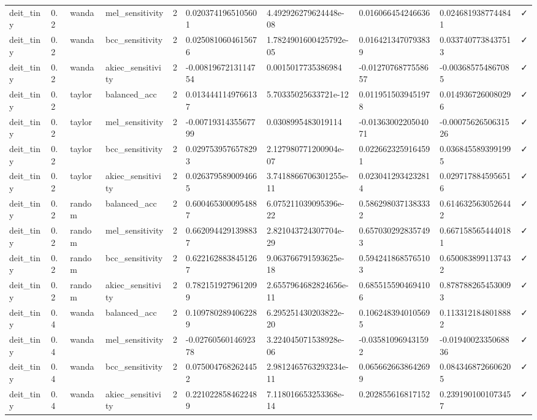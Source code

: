 \begin{table}[t]
\begin{tabular}{llllllllll}
deit\_tiny & 0.2 & wanda & mel\_sensitivity & 2 & 0.0203741965105601 & 4.492926279624448e-08 & 0.016066454246636 & 0.0246819387744841 & ✓ \\
deit\_tiny & 0.2 & wanda & bcc\_sensitivity & 2 & 0.0250810604615676 & 1.7824901600425792e-05 & 0.0164213470793839 & 0.0337407738437513 & ✓ \\
deit\_tiny & 0.2 & wanda & akiec\_sensitivity & 2 & -0.0081967213114754 & 0.0015017735386984 & -0.0127076877558657 & -0.003685754867085 & ✓ \\
deit\_tiny & 0.2 & taylor & balanced\_acc & 2 & 0.0134441149766137 & 5.70335025633721e-12 & 0.0119515039451978 & 0.0149367260080296 & ✓ \\
deit\_tiny & 0.2 & taylor & mel\_sensitivity & 2 & -0.0071931435567799 & 0.0308995483019114 & -0.0136300220504071 & -0.0007562650631526 & ✓ \\
deit\_tiny & 0.2 & taylor & bcc\_sensitivity & 2 & 0.0297539576578293 & 2.127980771200904e-07 & 0.0226623259164591 & 0.0368455893991995 & ✓ \\
deit\_tiny & 0.2 & taylor & akiec\_sensitivity & 2 & 0.0263795890094665 & 3.7418866706301255e-11 & 0.0230412934232814 & 0.0297178845956516 & ✓ \\
deit\_tiny & 0.2 & random & balanced\_acc & 2 & 0.6004653000954887 & 6.075211039095396e-22 & 0.5862980371383332 & 0.6146325630526442 & ✓ \\
deit\_tiny & 0.2 & random & mel\_sensitivity & 2 & 0.6620944291398837 & 2.821043724307704e-29 & 0.6570302928357493 & 0.6671585654440181 & ✓ \\
deit\_tiny & 0.2 & random & bcc\_sensitivity & 2 & 0.6221628838451267 & 9.063766791593625e-18 & 0.5942418685765103 & 0.6500838991137432 & ✓ \\
deit\_tiny & 0.2 & random & akiec\_sensitivity & 2 & 0.7821519279612099 & 2.6557964682824656e-11 & 0.6855155904694106 & 0.8787882654530093 & ✓ \\
deit\_tiny & 0.4 & wanda & balanced\_acc & 2 & 0.1097802894062289 & 6.295251430203822e-20 & 0.1062483940105695 & 0.1133121848018882 & ✓ \\
deit\_tiny & 0.4 & wanda & mel\_sensitivity & 2 & -0.0276056014692378 & 3.224045071538928e-06 & -0.035810969431592 & -0.0194002335068836 & ✓ \\
deit\_tiny & 0.4 & wanda & bcc\_sensitivity & 2 & 0.0750047682624452 & 2.9812465763293234e-11 & 0.0656626638642699 & 0.0843468726606205 & ✓ \\
deit\_tiny & 0.4 & wanda & akiec\_sensitivity & 2 & 0.2210228584622489 & 7.118016653253368e-14 & 0.202855616817152 & 0.2391901001073457 & ✓ \\

\end{tabular}
\end{table}
